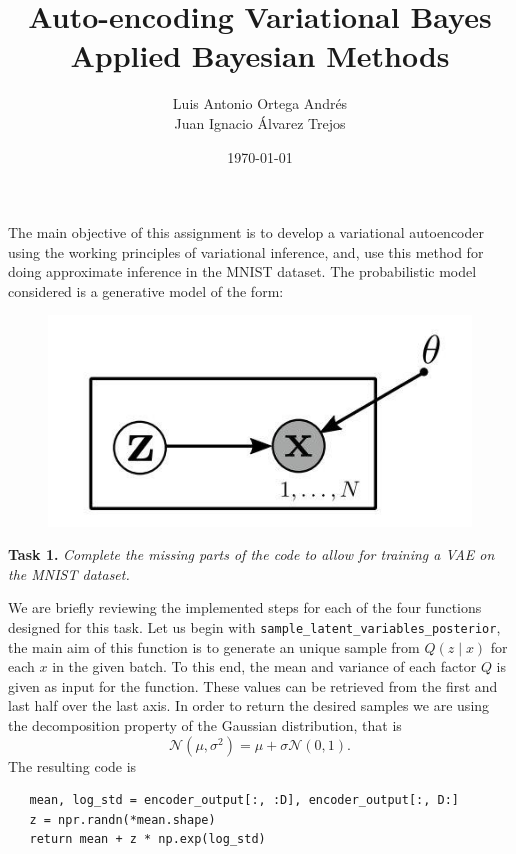 \documentclass[11pt]{article}
\author{Luis Antonio Ortega Andrés \\\medskip Juan Ignacio Álvarez Trejos}
\date{\today}
\title{Auto-encoding Variational Bayes\\\medskip
\large Applied Bayesian Methods}
\begin{document}
\maketitle

The main objective of this assignment is to develop a variational autoencoder using the working principles of variational inference, and, use this method for doing approximate inference in the MNIST dataset. The probabilistic model considered is a generative model of the form:

\begin{figure}[h]
  \centering
  \includegraphics[scale = 0.5]{imgs/model.jpg}
 \end{figure}

 \textbf{Task 1.} \emph{Complete the missing parts of the code to allow for training a VAE on the MNIST dataset.}

 We are briefly reviewing the implemented steps for each of the four functions designed for this task. Let us begin with \texttt{sample\_latent\_variables\_posterior}, the main aim of this function is to generate an unique sample from \( Q(z \mid x) \) for each \( x \) in the given batch. To this end, the mean and variance of each factor \( Q \) is given as input for the function. These values can be retrieved from the first and last half over the last axis. In order to return the desired samples we are using the decomposition property of the Gaussian distribution, that is
 \[
   \mathcal{N}(\mu, \sigma^{2}) = \mu + \sigma \mathcal{N}(0, 1).
 \]
 The resulting code is
 \begin{verbatim}
   mean, log_std = encoder_output[:, :D], encoder_output[:, D:]
   z = npr.randn(*mean.shape)
   return mean + z * np.exp(log_std)
 \end{verbatim}
\end{document}
